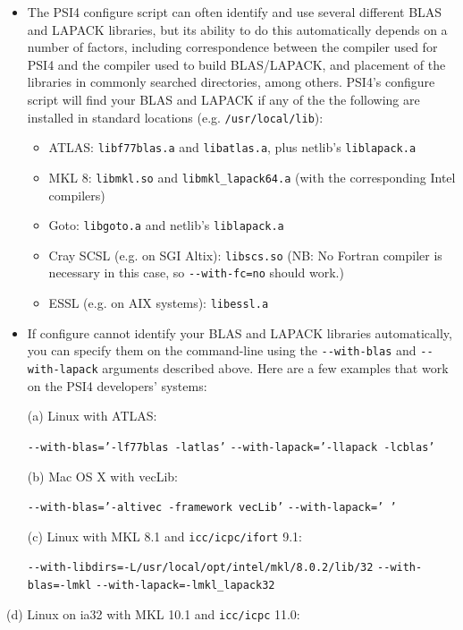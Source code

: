 \documentclass[12pt]{article}
\begin{document}
\begin{itemize}
\item The PSI4 configure script can often identify and use
  several different BLAS and LAPACK libraries, but its ability to do
  this automatically depends on a number of factors, including
  correspondence between the compiler used for PSI4 and the compiler
  used to build BLAS/LAPACK, and placement of the libraries in
  commonly searched directories, among others.  PSI4's configure
  script will find your BLAS and LAPACK if any of the the following
  are installed in standard locations (e.g. {\tt /usr/local/lib}):

\begin{itemize}  
    \item ATLAS: {\tt libf77blas.a} and {\tt libatlas.a}, plus netlib's
    {\tt liblapack.a}
    \item MKL 8: {\tt libmkl.so} and {\tt libmkl\_lapack64.a} (with the corresponding Intel compilers)
    \item Goto: {\tt libgoto.a} and netlib's {\tt liblapack.a}
    \item Cray SCSL (e.g. on SGI Altix): {\tt libscs.so} (NB: No Fortran compiler
      is necessary in this case, so {\tt -}{\tt -with-fc=no} should work.)
    \item ESSL (e.g. on AIX systems): {\tt libessl.a}
    \end{itemize}  
  \item If configure cannot identify your BLAS and LAPACK libraries
    automatically, you can specify them on the command-line using the
    {\tt -}{\tt -with-blas} and {\tt -}{\tt -with-lapack} arguments
    described above.  Here are a few examples that work on the PSI4
    developers' systems:
  
    (a) Linux with ATLAS:
  
    {\tt -}{\tt -with-blas='-lf77blas -latlas'} {\tt -}{\tt -with-lapack='-llapack -lcblas'}

    (b) Mac OS X with vecLib: 
  
    {\tt -}{\tt -with-blas='-altivec -framework vecLib'} {\tt -}{\tt -with-lapack=' '}
  
    (c) Linux with MKL 8.1 and {\tt icc/icpc/ifort} 9.1: 
  
    {\tt -}{\tt -with-libdirs=-L/usr/local/opt/intel/mkl/8.0.2/lib/32} {\tt -}{\tt -with-blas=-lmkl} {\tt -}{\tt -with-lapack=-lmkl\_lapack32}

\end{itemize}

    (d) Linux on ia32 with MKL 10.1 and {\tt icc/icpc} 11.0:
\end{document}
